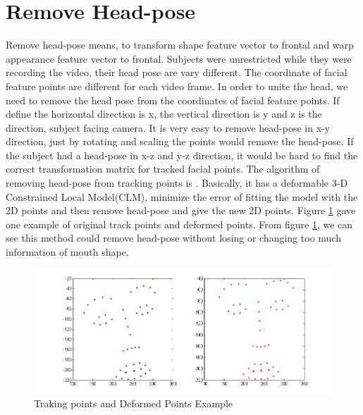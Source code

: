 \section{Remove Head-pose}
Remove head-pose means, to transform shape feature vector to frontal and warp appearance feature vector to frontal. Subjects were unrestricted while they were recording the video, their head pose are vary different. The coordinate of facial feature points are different for each video frame. In order to unite the head, we need to remove the head pose from the coordinates of facial feature points.  If define the horizontal direction is x, the vertical direction is y and z is the direction, subject facing camera. It is very easy to remove head-pose in x-y direction, just by rotating and scaling the points would remove the head-pose. If the subject had a head-pose in x-z and y-z direction, it would be hard to find the correct transformation matrix for tracked facial points. The algorithm of removing head-pose from tracking points is \cite{saragih2011deformable}. Basically, it has a deformable 3-D Constrained Local Model(CLM), minimize the error of fitting the model with the 2D points and then remove head-pose and give the new 2D points. Figure \ref{fig:RHP} gave one example of original track points and deformed points. From figure \ref{fig:RHP}, we can see this method could remove head-pose without losing or changing too much information of mouth shape.
\begin{figure}[ht]
\centering
\includegraphics[width=.6\textwidth]{imgs/160954_Deform_233.png}
\caption{Traking points and Deformed Points Example}
\label{fig:RHP}
\end{figure}
